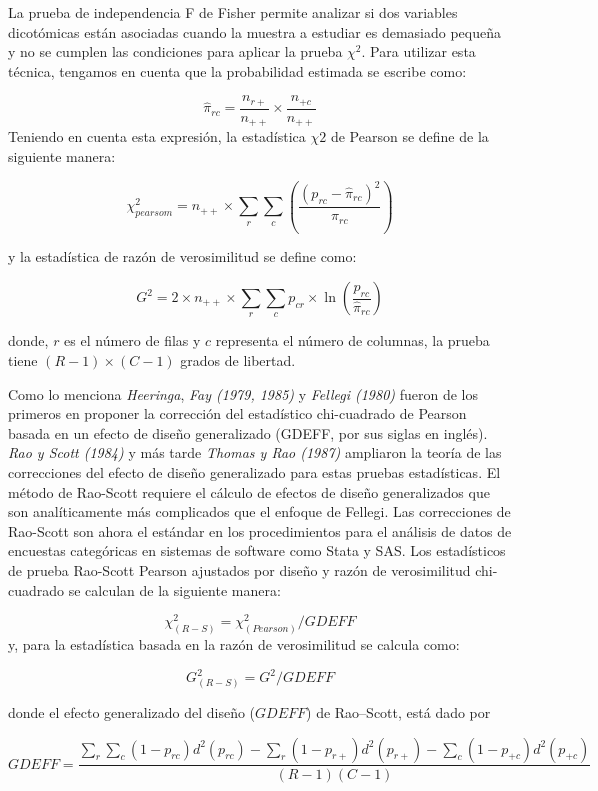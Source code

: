 \documentclass[
  spanish,
  12pt,
]{book}
\begin{document}
La prueba de independencia F de Fisher permite analizar si dos variables dicotómicas están asociadas cuando la muestra a estudiar es demasiado pequeña y no se cumplen las condiciones para aplicar la prueba \(\chi^{2}\). Para utilizar esta técnica, tengamos en cuenta que la probabilidad estimada se escribe como:

\[
\hat{\pi}_{rc}=\frac{n_{r+}}{n_{++}}\times\frac{n_{+c}}{n_{++}}
\]
Teniendo en cuenta esta expresión, la estadística \(\chi{2}\) de Pearson se define de la siguiente manera:

\[
\chi_{pearsom}^{2}=n_{++}\times\sum_{r}\sum_{c}\left(\frac{\left(p_{rc}-\hat{\pi}_{rc}\right)^{2}}{\hat{\pi}_{rc}}\right)
\]

y la estadística de razón de verosimilitud se define como:

\[
G^{2}=2\times n_{++}\times\sum_{r}\sum_{c}p_{cr}\times\ln\left(\frac{p_{rc}}{\hat{\pi}_{rc}}\right)
\]

donde, \(r\) es el número de filas y \(c\) representa el número de columnas, la prueba tiene \((R-1)\times (C-1)\) grados de libertad.

Como lo menciona \emph{Heeringa}, \emph{Fay (1979, 1985)} y \emph{Fellegi (1980)} fueron de los primeros en proponer la corrección del estadístico chi-cuadrado de Pearson basada en un efecto de diseño generalizado (GDEFF, por sus siglas en inglés). \emph{Rao y Scott (1984)} y más tarde \emph{Thomas y Rao (1987)} ampliaron la teoría de las correcciones del efecto de diseño generalizado para estas pruebas estadísticas. El método de Rao-Scott requiere el cálculo de efectos de diseño generalizados que son analíticamente más complicados que el enfoque de Fellegi. Las correcciones de Rao-Scott son ahora el estándar en los procedimientos para el análisis de datos de encuestas categóricas en sistemas de software como Stata y SAS. Los estadísticos de prueba Rao-Scott Pearson ajustados por diseño y razón de verosimilitud chi-cuadrado se calculan de la siguiente manera:

\[
\chi^2_{(R-S)} = \chi^2_{(Pearson)}\big/GDEFF
\]
y, para la estadística basada en la razón de verosimilitud se calcula como:

\[
G^2_{(R-S)}  =  G^2\big/GDEFF
\]

donde el efecto generalizado del diseño (\(GDEFF\)) de Rao--Scott, está dado por

\[
GDEFF=\frac{\sum_{r}\sum_{c}\left(1-p_{rc}\right)d^{2}\left(p_{rc}\right)-\sum_{r}\left(1-p_{r+}\right)d^{2}\left(p_{r+}\right)-\sum_{c}\left(1-p_{+c}\right)d^{2}\left(p_{+c}\right)}{\left(R-1\right)\left(C-1\right)}
\]
\end{document}
